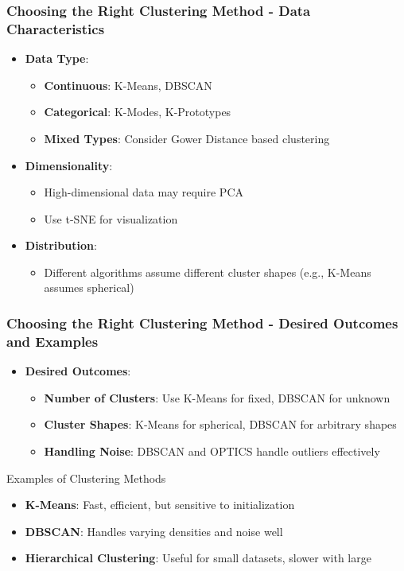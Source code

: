 \documentclass[aspectratio=169]{beamer}
\begin{document}
\begin{frame}[fragile]
    \frametitle{Choosing the Right Clustering Method - Data Characteristics}
    \begin{itemize}
        \item \textbf{Data Type}:
            \begin{itemize}
                \item \textbf{Continuous}: K-Means, DBSCAN
                \item \textbf{Categorical}: K-Modes, K-Prototypes
                \item \textbf{Mixed Types}: Consider Gower Distance based clustering
            \end{itemize}
        \item \textbf{Dimensionality}:
            \begin{itemize}
                \item High-dimensional data may require PCA
                \item Use t-SNE for visualization
            \end{itemize}
        \item \textbf{Distribution}:
            \begin{itemize}
                \item Different algorithms assume different cluster shapes (e.g., K-Means assumes spherical)
            \end{itemize}
    \end{itemize}
\end{frame}

\begin{frame}[fragile]
    \frametitle{Choosing the Right Clustering Method - Desired Outcomes and Examples}
    \begin{itemize}
        \item \textbf{Desired Outcomes}:
            \begin{itemize}
                \item \textbf{Number of Clusters}: Use K-Means for fixed, DBSCAN for unknown
                \item \textbf{Cluster Shapes}: K-Means for spherical, DBSCAN for arbitrary shapes
                \item \textbf{Handling Noise}: DBSCAN and OPTICS handle outliers effectively
            \end{itemize}
    \end{itemize}
    
    \begin{block}{Examples of Clustering Methods}
        \begin{itemize}
            \item \textbf{K-Means}: Fast, efficient, but sensitive to initialization
            \item \textbf{DBSCAN}: Handles varying densities and noise well
            \item \textbf{Hierarchical Clustering}: Useful for small datasets, slower with large
        \end{itemize}
    \end{block}
\end{frame}
\end{document}
